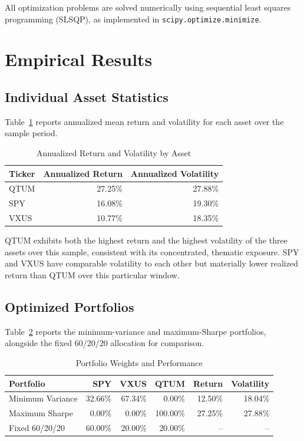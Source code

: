 \documentclass[11pt]{article}
\begin{document}
All optimization problems are solved numerically using sequential least
squares programming (SLSQP), as implemented in \texttt{scipy.optimize.minimize}.

\section{Empirical Results}

\subsection{Individual Asset Statistics}

Table~\ref{tab:stats} reports annualized mean return and volatility for each
asset over the sample period.

\begin{table}[h]
\centering
\caption{Annualized Return and Volatility by Asset}
\label{tab:stats}
\begin{tabular}{@{}lrr@{}}
\toprule
Ticker & Annualized Return & Annualized Volatility \\
\midrule
QTUM  & 27.25\% & 27.88\% \\
SPY   & 16.08\% & 19.30\% \\
VXUS  & 10.77\% & 18.35\% \\
\bottomrule
\end{tabular}
\end{table}

QTUM exhibits both the highest return and the highest volatility of the
three assets over this sample, consistent with its concentrated, thematic
exposure. SPY and VXUS have comparable volatility to each other but
materially lower realized return than QTUM over this particular window.

\subsection{Optimized Portfolios}

Table~\ref{tab:portfolios} reports the minimum-variance and maximum-Sharpe
portfolios, alongside the fixed 60/20/20 allocation for comparison.

\begin{table}[h]
\centering
\caption{Portfolio Weights and Performance}
\label{tab:portfolios}
\begin{tabular}{@{}lrrrrr@{}}
\toprule
Portfolio & SPY & VXUS & QTUM & Return & Volatility \\
\midrule
Minimum Variance & 32.66\% & 67.34\% & 0.00\%  & 12.50\% & 18.04\% \\
Maximum Sharpe   & 0.00\%  & 0.00\%  & 100.00\% & 27.25\% & 27.88\% \\
Fixed 60/20/20   & 60.00\% & 20.00\% & 20.00\%  & --      & --      \\
\bottomrule
\end{tabular}
\end{table}
\end{document}
